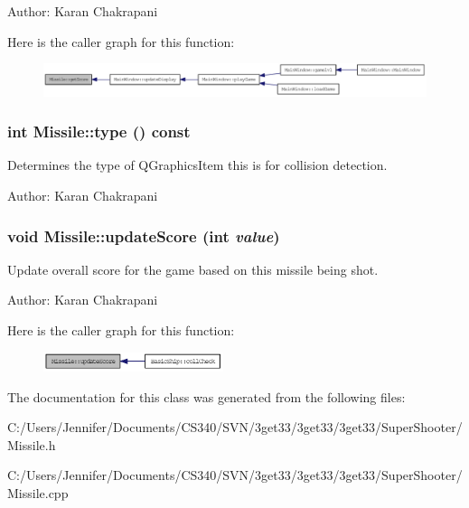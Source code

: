 Author: Karan Chakrapani 

Here is the caller graph for this function:\nopagebreak
\begin{figure}[H]
\begin{center}
\leavevmode
\includegraphics[width=399pt]{class_missile_a1287c194f7a2b619fc5ebc126707d29b_icgraph}
\end{center}
\end{figure}
\hypertarget{class_missile_aa176a8e8b698167fe1b901c4f91a6a31}{
\subsubsection[{type}]{\setlength{\rightskip}{0pt plus 5cm}int Missile::type () const}}
\label{class_missile_aa176a8e8b698167fe1b901c4f91a6a31}
Determines the type of QGraphicsItem this is for collision detection.

Author: Karan Chakrapani \hypertarget{class_missile_adf81e1df24765a7a9c9878beacd67842}{
\subsubsection[{updateScore}]{\setlength{\rightskip}{0pt plus 5cm}void Missile::updateScore (int {\em value})}}
\label{class_missile_adf81e1df24765a7a9c9878beacd67842}
Update overall score for the game based on this missile being shot.

Author: Karan Chakrapani 

Here is the caller graph for this function:\nopagebreak
\begin{figure}[H]
\begin{center}
\leavevmode
\includegraphics[width=149pt]{class_missile_adf81e1df24765a7a9c9878beacd67842_icgraph}
\end{center}
\end{figure}


The documentation for this class was generated from the following files:\begin{DoxyCompactItemize}
\item 
C:/Users/Jennifer/Documents/CS340/SVN/3get33/3get33/3get33/SuperShooter/Missile.h\item 
C:/Users/Jennifer/Documents/CS340/SVN/3get33/3get33/3get33/SuperShooter/Missile.cpp\end{DoxyCompactItemize}
